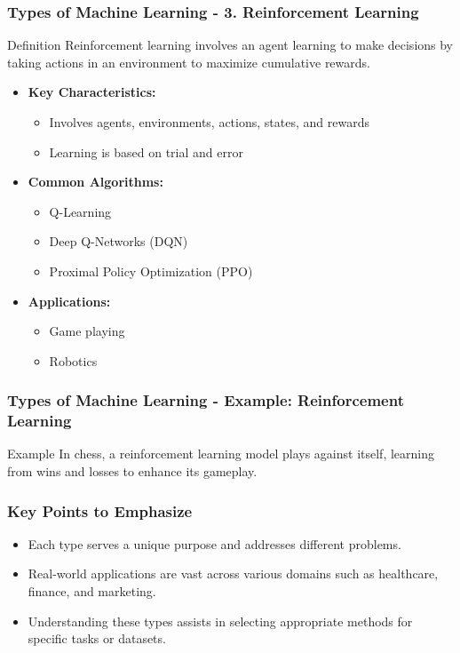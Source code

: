 \documentclass[aspectratio=169]{beamer}
\begin{document}
\begin{frame}[fragile]
    \frametitle{Types of Machine Learning - 3. Reinforcement Learning}
    \begin{block}{Definition}
        Reinforcement learning involves an agent learning to make decisions by taking actions in an environment to maximize cumulative rewards.
    \end{block}

    \begin{itemize}
        \item \textbf{Key Characteristics:}
        \begin{itemize}
            \item Involves agents, environments, actions, states, and rewards
            \item Learning is based on trial and error
        \end{itemize}
        \item \textbf{Common Algorithms:}
        \begin{itemize}
            \item Q-Learning
            \item Deep Q-Networks (DQN)
            \item Proximal Policy Optimization (PPO)
        \end{itemize}
        \item \textbf{Applications:}
        \begin{itemize}
            \item Game playing
            \item Robotics
        \end{itemize}
    \end{itemize}
\end{frame}

\begin{frame}[fragile]
    \frametitle{Types of Machine Learning - Example: Reinforcement Learning}
    \begin{block}{Example}
        In chess, a reinforcement learning model plays against itself, learning from wins and losses to enhance its gameplay.
    \end{block}
\end{frame}

\begin{frame}[fragile]
    \frametitle{Key Points to Emphasize}
    \begin{itemize}
        \item Each type serves a unique purpose and addresses different problems.
        \item Real-world applications are vast across various domains such as healthcare, finance, and marketing.
        \item Understanding these types assists in selecting appropriate methods for specific tasks or datasets.
    \end{itemize}
\end{frame}
\end{document}
